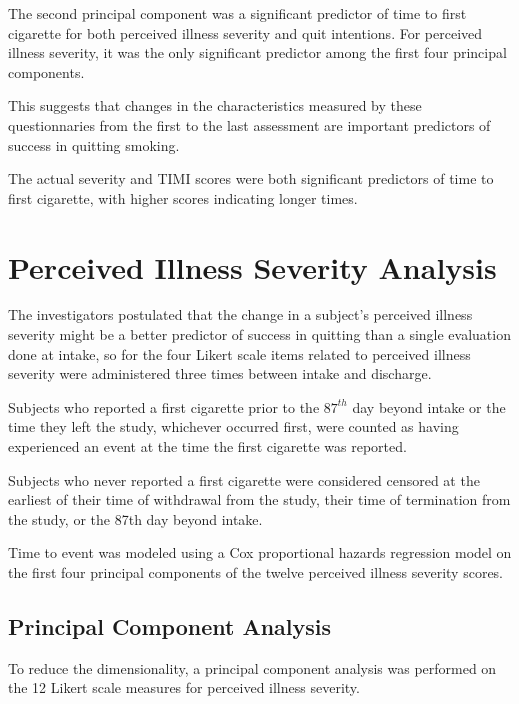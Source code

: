 \documentclass[12pt]{article}
\begin{document}
The second principal component was a significant predictor of time to first cigarette for both perceived illness severity and quit intentions.  For perceived illness severity, it was the only significant predictor among the first four principal components.  
\par\vspace{0.3 cm}
This suggests that changes in the characteristics measured by these questionnaries from the first to the last assessment are important predictors of success in quitting smoking.
\par\vspace{0.3 cm}
The actual severity and TIMI scores were both significant predictors of time to first cigarette, with higher scores indicating longer times.
\section*{Perceived Illness Severity Analysis}
\par\vspace{0.3 cm}
The investigators postulated that the change in a subject's perceived illness severity might be a better predictor of success in quitting than a single evaluation done at intake, so for the four Likert scale items related to perceived illness severity were administered three times between intake and discharge.
\par\vspace{0.3 cm}
Subjects who reported a first cigarette prior to the $87^{th}$ day beyond intake or the time they left the study, whichever occurred first, were counted as having experienced an event at the time the first cigarette was reported.  
\par\vspace{0.3 cm}
Subjects who never reported a first cigarette were considered censored at the earliest of their time of withdrawal from the study, their time of termination from the study, or the 87th day beyond intake.
\par\vspace{0.3 cm}
Time to event was modeled using a Cox proportional hazards regression model on the first four principal components of the twelve perceived illness severity scores.   
\subsection*{Principal Component Analysis}
To reduce the dimensionality, a principal component analysis was performed on the 12 Likert scale measures for perceived illness severity.
\par\vspace{0.3 cm}
\end{document}

